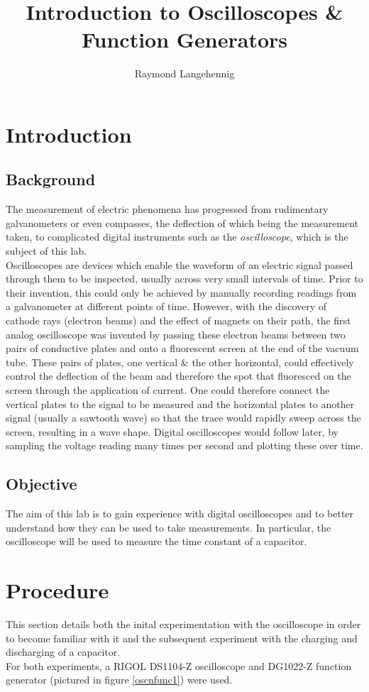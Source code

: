 \documentclass{article}
\title{Introduction to Oscilloscopes \& Function Generators}
\author{Raymond Langehennig}
\begin{document}
\maketitle

\section{Introduction}
    \subsection{Background}
        The measurement of electric phenomena has progressed from rudimentary galvanometers or even compasses, the deflection of which being the measurement taken, to complicated digital instruments such as the \emph{oscilloscope}, which is the subject of this lab.\\
        Oscilloscopes are devices which enable the waveform of an electric signal passed through them to be inspected, usually across very small intervals of time. Prior to their invention, this could only be achieved by manually recording readings from a galvanometer at different points of time. However, with the discovery of cathode rays (electron beams) and the effect of magnets on their path, the first analog oscilloscope was invented by passing these electron beams between two pairs of conductive plates and onto a fluorescent screen at the end of the vacuum tube. These pairs of plates, one vertical \& the other horizontal, could effectively control the deflection of the beam and therefore the spot that fluoresced on the screen through the application of current. One could therefore connect the vertical plates to the signal to be measured and the horizontal plates to another signal (usually a sawtooth wave) so that the trace would rapidly sweep across the screen, resulting in a wave shape. Digital oscilloscopes would follow later, by sampling the voltage reading many times per second and plotting these over time.

    \subsection{Objective}
    The aim of this lab is to gain experience with digital oscilloscopes and to better understand how they can be used to take measurements. In particular, the oscilloscope will be used to measure the time constant of a capacitor.
    

\section{Procedure}
    This section details both the inital experimentation with the oscilloscope in order to become familiar with it and the subsequent experiment with the charging and discharging of a capacitor.\\ %
    For both experiments, a RIGOL DS1104-Z oscilloscope and DG1022-Z function generator (pictured in figure \ref{oscnfunc1}) were used.
\end{document}
